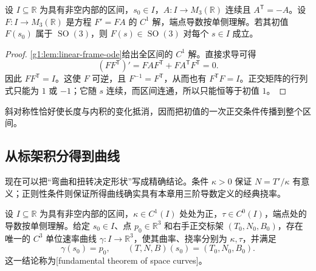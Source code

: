 \begin{proposition}
	\label{g1:prop:skew-frame-orthogonality}
	设 \(I\subseteq\mathbb R\) 为具有非空内部的区间，\(s_0\in I\)，\(A\colon I\rightarrow M_3(\mathbb R)\) 连续且 \(A^{\mathsf T}=-A\)。设 \(F:I\to M_3(\mathbb R)\) 是方程 \(F'=FA\) 的 \(C^1\) 解，端点导数按单侧理解。若其初值 \(F(s_0)\) 属于 \(\operatorname{SO}(3)\)，则 \(F(s)\in \operatorname{SO}(3)\) 对每个 \(s\in I\) 成立。
\end{proposition}

\begin{proof}
	\cref{g1:lem:linear-frame-ode}给出全区间的 \(C^1\) 解。直接求导可得
	\[
		(FF^{\mathsf T})'=FAF^{\mathsf T}+FA^{\mathsf T}F^{\mathsf T}=0.
	\]
	因此 \(FF^{\mathsf T}=I\)。这使 \(F\) 可逆，且 \(F^{-1}=F^{\mathsf T}\)，从而也有 \(F^{\mathsf T}F=I\)。正交矩阵的行列式只能为 \(1\) 或 \(-1\)；它随 \(s\) 连续，而区间连通，所以只能恒等于初值 \(1\)。
\end{proof}

斜对称性恰好使长度与内积的变化抵消，因而把初值的一次正交条件传播到整个区间。

\subsection{从标架积分得到曲线}
\label{g1:subsec:0702:02}

现在可以把“弯曲和扭转决定形状”写成精确结论。条件 \(\kappa>0\) 保证 \(N=T'/\kappa\) 有意义；正则性条件则保证所得曲线确实具有本章用三阶导数定义的经典挠率。

\begin{theorem}
	\label{g1:thm:space-curve-fundamental}
	设 \(I\subseteq\mathbb R\) 为具有非空内部的区间，\(\kappa\in C^1(I)\) 处处为正，\(\tau\in C^0(I)\)，端点处的导数按单侧理解。给定 \(s_0\in I\)、点 \(p_0\in\mathbb R^3\) 和右手正交标架 \((T_0,N_0,B_0)\)，存在唯一的 \(C^3\) 单位速率曲线 \(\gamma\colon I\rightarrow\mathbb R^3\)，使其曲率、挠率分别为 \(\kappa,\tau\)，并满足
	\[
		\gamma(s_0)=p_0,\qquad
		(T,N,B)(s_0)=(T_0,N_0,B_0).
	\]
	这一结论称为[fundamental theorem of space curves]。
\end{theorem}

